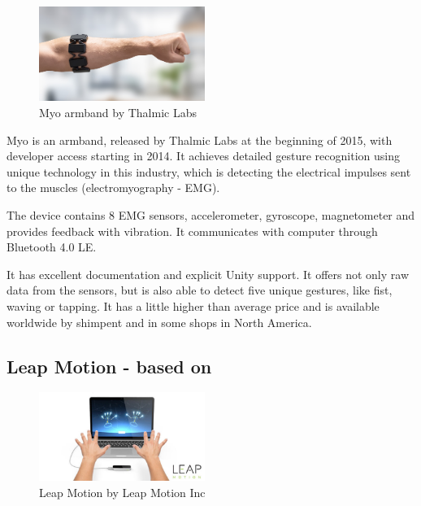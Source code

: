 \begin{figure}
\includegraphics[width=0.48\textwidth]{graphics/myo.jpg} 
\vspace{-8pt}
\caption{Myo armband by Thalmic Labs}
\label{fig:myo}
\end{figure}

Myo is an armband, released by Thalmic Labs at the beginning of 2015, with developer access starting in 2014. It achieves detailed gesture recognition using unique technology in this industry, which is detecting the electrical impulses sent to the muscles (electromyography - EMG). 

The device contains 8 EMG sensors, accelerometer, gyroscope, magnetometer and provides feedback with vibration. It communicates with computer through Bluetooth 4.0 LE. 

It has excellent documentation and explicit Unity support. It offers not only raw data from the sensors, but is also able to detect five unique gestures, like fist, waving or tapping. It has a little higher than average price and is available worldwide by shimpent and in some shops in North America. 



\subsection[title=Leap Motion]{Leap Motion - based on \cite{Leap, leap_article, leap_pop}}

\begin{figure}
\includegraphics[width=0.48\textwidth]{graphics/leap.jpg} 
\caption{Leap Motion by Leap Motion Inc}
\vspace{-9pt}
\label{fig:leap}
\end{figure}

